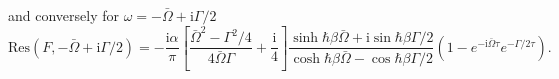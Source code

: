 %
and conversely for $\omega=-\bar{\Omega}+\text{i}\Gamma/2$
%
\begin{equation}
    \text{Res}(F,-\bar{\Omega}+\text{i}\Gamma/2)=-\frac{\text{i}\alpha}{\pi}
    \left[ \frac{\bar{\Omega}^2-\Gamma^2/4}{4\bar{\Omega}\Gamma}+\frac{\text{i}}{4} \right]
    \frac{\sinh\hbar\beta\bar{\Omega}+\text{i}\sin\hbar\beta\Gamma/2}{\cosh\hbar\beta\bar{\Omega}-\cos\hbar\beta\Gamma/2}
    (1-e^{-\text{i}\bar{\Omega}\tau}e^{-\Gamma/2\tau}).
\end{equation}
%